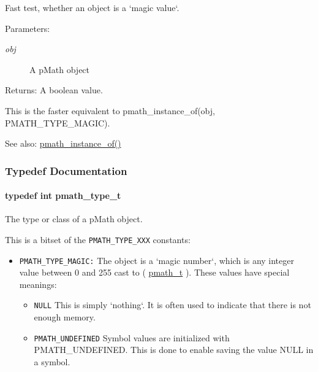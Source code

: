Fast test, whether an object is a `magic value`. 

\begin{Desc}
\item[Parameters:]
\begin{description}
\item[{\em obj}]A pMath object \end{description}
\end{Desc}
\begin{Desc}
\item[Returns:]A boolean value.\end{Desc}
This is the faster equivalent to pmath\_\-instance\_\-of(obj, PMATH\_\-TYPE\_\-MAGIC).

\begin{Desc}
\item[See also:]\hyperlink{classpmath__t_0bd527f1ec2db8f1eba58e1fd84babbc}{pmath\_\-instance\_\-of()} \end{Desc}


\subsubsection{Typedef Documentation}
\hypertarget{group__objects_ge2646df76dcb0113715322b13a1f36f0}{
\paragraph[{pmath\_\-type\_\-t}]{\setlength{\rightskip}{0pt plus 5cm}typedef int {\bf pmath\_\-type\_\-t}}\hfill}
\label{group__objects_ge2646df76dcb0113715322b13a1f36f0}


The type or class of a pMath object. 

This is a bitset of the {\tt PMATH\_\-TYPE\_\-XXX} constants:

\begin{itemize}
\item {\tt PMATH\_\-TYPE\_\-MAGIC:} The object is a `magic number`, which is any integer value between 0 and 255 cast to ( \hyperlink{classpmath__t}{pmath\_\-t} ). These values have special meanings:\begin{itemize}
\item {\tt NULL} This is simply `nothing`. It is often used to indicate that there is not enough memory.\item {\tt PMATH\_\-UNDEFINED} Symbol values are initialized with PMATH\_\-UNDEFINED. This is done to enable saving the value NULL in a symbol.\end{itemize}
\end{itemize}


